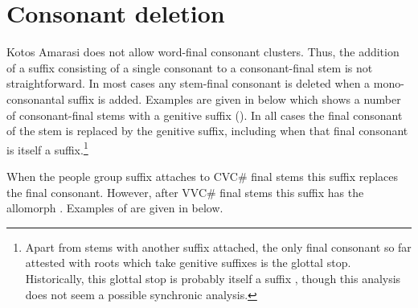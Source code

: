 \section{Consonant deletion}\label{sec:ConDel ch:Phon}
Kotos Amarasi does not allow word-final consonant clusters.
Thus, the addition of a suffix consisting of a single consonant
to a consonant-final stem is not straightforward.
In most cases any stem-final consonant is deleted when
a mono-consonantal suffix is added.
Examples are given in  below
which shows a number of consonant-final stems with
a genitive suffix ().
In all cases the final consonant of the stem
is replaced by the genitive suffix, including
when that final consonant is itself a suffix.\footnote{
		Apart from stems with another suffix attached,
		the only final consonant so far attested
		with roots which take genitive suffixes is the glottal stop.
		Historically, this glottal stop is probably itself a suffix \citep[77]{ed18d},
		though this analysis does not seem a possible synchronic analysis.}

\newpage
\begin{exe}
	\label{ex:GloStoRepGenSuf}
\end{exe}

When the people group suffix 
attaches to CVC{\#} final stems this suffix replaces the final consonant.
However, after VVC{\#} final stems this suffix has the allomorph .
Examples of  are given in  below.


